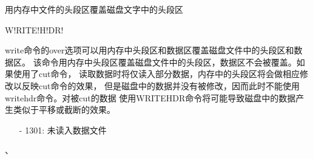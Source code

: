 \label{cmd:writehdr}

用内存中文件的头段区覆盖磁盘文字中的头段区

\begin{SACSTX}
W!RITE!H!DR!
\end{SACSTX}

write命令的over选项可以用内存中头段区和数据区覆盖磁盘文件中的头段区和数据区。
该命令用内存中头段区覆盖磁盘文件中的头段区，数据区不会被覆盖。如果使用了cut命令，
读取数据时将仅读入部分数据，内存中的头段区将会做相应修改以反映cut命令的效果，
但是磁盘中的数据并没有被修改，因而此时不能使用writehdr命令。对被cut的数据
使用WRITEHDR命令将可能导致磁盘中的数据产生类似于平移或截断的效果。

\begin{itemize}
\item[-]1301: 未读入数据文件
\end{itemize}

、
